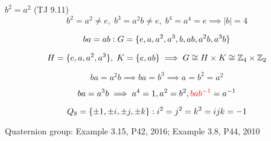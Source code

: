 \begin{frame}{$b^2 = a^2$ (TJ 9.11)}
  \[
    b^2 = a^2 \neq e,\; b^3 = a^2b \neq e,\; b^4 = a^4 = e \implies |b| = 4
  \]

  \[
    ba = ab: G = \{e, a, a^2, a^3, b, ab, a^2b, a^3b\}
  \]

  \[
    H = \{e, a, a^2, a^3\},\; K = \{e, ab\} \implies G \cong H \times K \cong \mathbb{Z}_{4} \times \mathbb{Z}_{2} 
  \]

  \[
    ba = a^2b \implies ba = b^3 \implies a = b^2 = a^2
  \]

  \[
    ba = a^3b \implies a^4 = 1, a^2 = b^2, \textcolor{red}{bab^{-1}} = a^{-1}
  \]

  \[
    Q_8 = \{\pm 1, \pm i, \pm j, \pm k\}: i^2 = j^2 = k^2 = ijk = -1
  \]

  \centerline{Quaternion group: Example 3.15, P42, 2016; Example 3.8, P44, 2010}
\end{frame}
